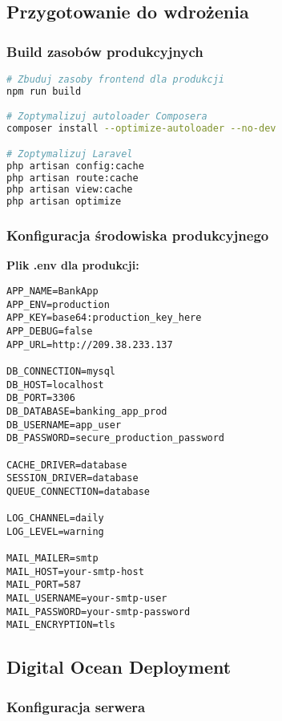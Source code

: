 \documentclass[12pt,a4paper]{article}
\begin{document}
    \subsection{Przygotowanie do wdrożenia}

    \subsubsection{Build zasobów produkcyjnych}

    \begin{lstlisting}[language=bash, caption=Budowanie zasobów dla produkcji]
# Zbuduj zasoby frontend dla produkcji
npm run build

# Zoptymalizuj autoloader Composera
composer install --optimize-autoloader --no-dev

# Zoptymalizuj Laravel
php artisan config:cache
php artisan route:cache
php artisan view:cache
php artisan optimize
    \end{lstlisting}

    \subsubsection{Konfiguracja środowiska produkcyjnego}

    \textbf{Plik .env dla produkcji:}
    \begin{lstlisting}[caption=Przykładowa konfiguracja produkcyjna]
APP_NAME=BankApp
APP_ENV=production
APP_KEY=base64:production_key_here
APP_DEBUG=false
APP_URL=http://209.38.233.137

DB_CONNECTION=mysql
DB_HOST=localhost
DB_PORT=3306
DB_DATABASE=banking_app_prod
DB_USERNAME=app_user
DB_PASSWORD=secure_production_password

CACHE_DRIVER=database
SESSION_DRIVER=database
QUEUE_CONNECTION=database

LOG_CHANNEL=daily
LOG_LEVEL=warning

MAIL_MAILER=smtp
MAIL_HOST=your-smtp-host
MAIL_PORT=587
MAIL_USERNAME=your-smtp-user
MAIL_PASSWORD=your-smtp-password
MAIL_ENCRYPTION=tls
    \end{lstlisting}

    \subsection{Digital Ocean Deployment}

    \subsubsection{Konfiguracja serwera}
\end{document}
